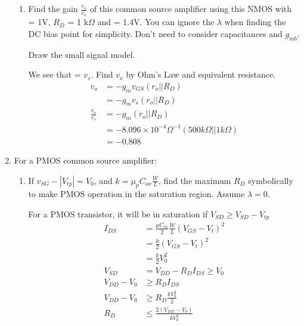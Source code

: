 \begin{enumerate}
\begin{enumerate}
        \item Find the gain $\frac{v_o}{v_s}$ of this common source amplifier using this NMOS with \vgs = 1V, $R_D$ = 1 k$\Omega$ and \vdd = 1.4V. You can ignore the $\lambda$ when finding the DC bias point for simplicity. Don't need to consider capacitances and $g_{mb}$.
        \begin{Ans}
            Draw the small signal model.
            
            We see that \vgs = $v_s$. Find $v_o$ by Ohm's Law and equivalent resistance.
            \begin{align*}
                v_o &= -g_m v_{GS} (r_o || R_D) \\
                &= -g_m v_s (r_o || R_D) \\
                \frac{v_o}{v_s} &= -g_m (r_o || R_D) \\
                &= -8.096 \times 10^{-4} \Omega^{-1} (500 k\Omega || 1 k\Omega) \\
                &= -0.808
            \end{align*}
        \end{Ans}
    \end{enumerate}

    \item For a PMOS common source amplifier:
    
    \begin{enumerate}
        \item If $v_{SG} - |V_{tp}| = V_0$, and $k = \mu_p C_{ox} \frac{W}{L}$, find the maximum $R_D$ symbolically to make PMOS operation in the saturation region. Assume $\lambda = 0$. 
        \begin{Ans}
            For a PMOS transistor, it will be in saturation if $V_{SD} \geq V_{SD} - V_{tp}$
            \begin{align*}
                I_{DS} &= \frac{\mu C_{ox}}{2} \frac{W}{L} (V_{GS} - V_t)^2 \\ 
                &= \frac{k}{2} (V_{GS} - V_t)^2 \\
                &= \frac{k}{2} V_0^2 \\
                V_{SD} &= V_{DD} - R_D I_{DS} \geq V_0 \\
                V_{DD} - V_0 &\geq R_D I_{DS} \\
                V_{DD} - V_0 &\geq R_D \frac{k V_0^2}{2} \\
                R_D &\leq \frac{2 (V_{DD} - V_0)}{kV_0^2}
            \end{align*}
        \end{Ans}


\end{enumerate}
\end{enumerate}
